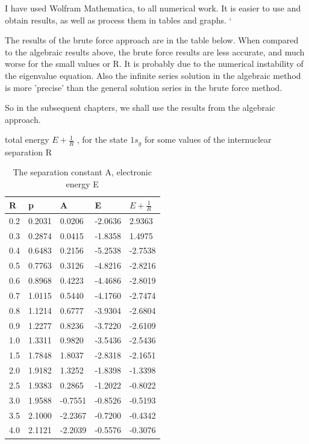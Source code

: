 I have used Wolfram Mathematica, to all numerical work. It is easier to use and obtain results, as well as process them in tables and graphs. `


The results of the brute force approach are in the table below. When compared to the algebraic results above, the brute force results are less accurate, and much worse for the small values or R.  It is probably due to the numerical instability of the eigenvalue equation. Also the infinite series solution in the algebraic method is more 'precise' than the general solution series in the brute force method.

So in the subsequent chapters, we shall use the results from the algebraic approach.

  \begin{table}[h]
      \caption{ The separation constant A, electronic energy E}{ total energy $ E + \frac{1}{R} $ , for the state $ 1s_g $}{ for some values of the internuclear separation R}
\centering
		\begin{tabular}{ m{6em} m{6em}  m{6em}  m{6em} m{6em} }
		\hline
		    R & p & A & E & $ E + \frac{1}{R} $ \\ \hline \hline
        0.2 & 0.2031 & 0.0206 & -2.0636 & 2.9363 \\
        0.3 & 0.2874 & 0.0415 & -1.8358 & 1.4975 \\
        0.4 & 0.6483 & 0.2156 & -5.2538 & -2.7538 \\
        0.5 & 0.7763 & 0.3126 & -4.8216 & -2.8216 \\
        0.6 & 0.8968 & 0.4223 & -4.4686 & -2.8019 \\
        0.7 & 1.0115 & 0.5440 & -4.1760 & -2.7474 \\
        0.8 & 1.1214 & 0.6777 & -3.9304 & -2.6804 \\
        0.9 & 1.2277 & 0.8236 & -3.7220 & -2.6109 \\
        1.0 & 1.3311 & 0.9820 & -3.5436 & -2.5436 \\
        1.5 & 1.7848 & 1.8037 & -2.8318 & -2.1651 \\
        2.0 & 1.9182 & 1.3252 & -1.8398 & -1.3398 \\
        2.5 & 1.9383 & 0.2865 & -1.2022 & -0.8022 \\
        3.0 & 1.9588 & -0.7551 & -0.8526 & -0.5193 \\
        3.5 & 2.1000 & -2.2367 & -0.7200 & -0.4342 \\
        4.0 & 2.1121 & -2.2039 & -0.5576 & -0.3076 \\

\end{tabular}
\end{table}
